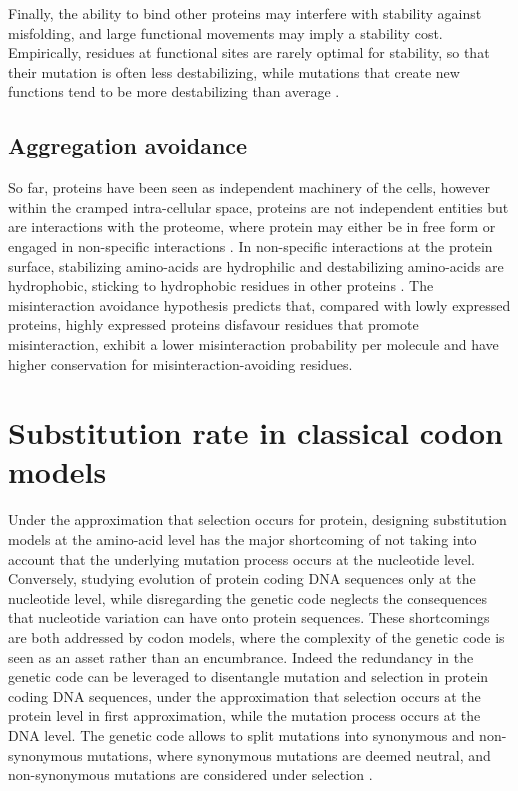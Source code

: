 Finally, the ability to bind other proteins may interfere with stability against misfolding, and large functional movements may imply a stability cost.
Empirically, residues at functional sites are rarely optimal for stability, so that their mutation is often less destabilizing, while mutations that create new functions tend to be more destabilizing than average \citep{Chi2016}.

\subsection{Aggregation avoidance}

So far, proteins have been seen as independent machinery of the cells, however within the cramped intra-cellular space, proteins are not independent entities but are interactions with the proteome, where protein may either be in free form or engaged in non-specific interactions \citep{Yang2012, Zhang2013}.
In non-specific interactions at the protein surface, stabilizing amino-acids are hydrophilic and destabilizing amino-acids are hydrophobic, sticking to hydrophobic residues in other proteins \citep{Dixit2013,Manhart2015}.
The misinteraction avoidance hypothesis predicts that, compared with lowly expressed proteins, highly expressed proteins disfavour residues that promote misinteraction, exhibit a lower misinteraction probability per molecule and have higher conservation for misinteraction-avoiding residues.

\section{Substitution rate in classical codon models}

Under the approximation that selection occurs for protein, designing \gls{substitution} models at the amino-acid level has the major shortcoming of not taking into account that the underlying mutation process occurs at the nucleotide level.
Conversely, studying evolution of protein coding \acrshort{DNA} sequences only at the nucleotide level, while disregarding the genetic code neglects the consequences that nucleotide variation can have onto protein sequences.
These shortcomings are both addressed by \gls{codon} models, where the complexity of the genetic code is seen as an asset rather than an encumbrance.
Indeed the redundancy in the genetic code can be leveraged to disentangle mutation and selection in protein coding \acrshort{DNA} sequences, under the approximation that selection occurs at the protein level in first approximation, while the mutation process occurs at the \acrshort{DNA} level.
The genetic code allows to split mutations into synonymous and non-synonymous mutations, where synonymous mutations are deemed \gls{neutral}, and non-synonymous mutations are considered under selection \citep{Muse1994,Goldman1994}.

